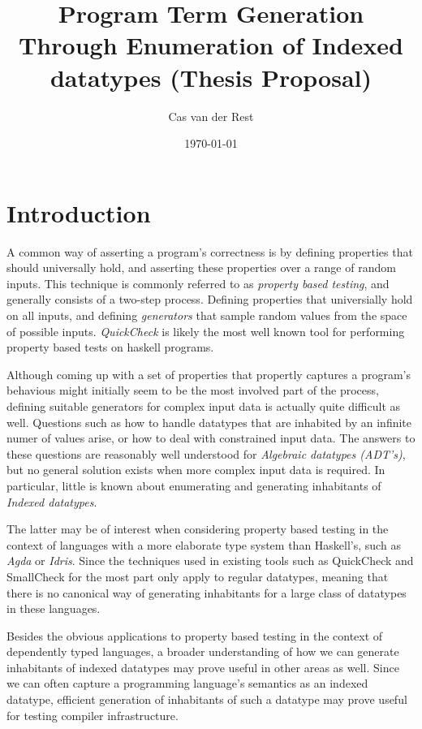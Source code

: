 \documentclass[11pt]{article}
\title{Program Term Generation Through Enumeration of Indexed datatypes (Thesis Proposal)}
\author{Cas van der Rest}
\date{\today}
\begin{document}
\maketitle

\tableofcontents 

\newpage

\section{Introduction}

A common way of asserting a program's correctness is by defining properties that should universally hold, and asserting these properties over a range of random inputs. This technique is commonly referred to as \textit{property based testing}, and generally consists of a two-step process. Defining properties that universially hold on all inputs, and defining \textit{generators} that sample random values from the space of possible inputs. \textit{QuickCheck} \cite{claessen2011quickcheck} is likely the most well known tool for performing property based tests on haskell programs. 

Although coming up with a set of properties that propertly captures a program's behavious might initially seem to be the most involved part of the process, defining suitable generators for complex input data is actually quite difficult as well. Questions such as how to handle datatypes that are inhabited by an infinite numer of values arise, or how to deal with constrained input data. The answers to these questions are reasonably well understood for \textit{Algebraic datatypes (ADT's)}, but no general solution exists when more complex input data is required. In particular, little is known about enumerating and generating inhabitants of \textit{Indexed datatypes}. 

The latter may be of interest when considering property based testing in the context of languages with a more elaborate type system than Haskell's, such as \textit{Agda} or \textit{Idris}. Since the techniques used in existing tools such as QuickCheck and SmallCheck for the most part only apply to regular datatypes, meaning that there is no canonical way of generating inhabitants for a large class of datatypes in these languages. 

Besides the obvious applications to property based testing in the context of dependently typed languages, a broader understanding of how we can generate inhabitants of indexed datatypes may prove useful in other areas as well. Since we can often capture a programming language's semantics as an indexed datatype, efficient generation of inhabitants of such a datatype may prove useful for testing compiler infrastructure. 
\end{document}
